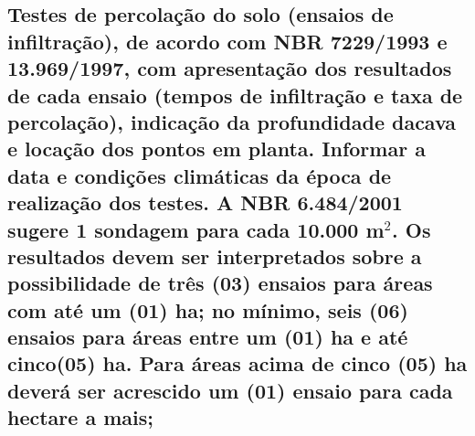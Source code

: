 \subsection{Testes de percolação do solo (ensaios de infiltração), de acordo com NBR 7229/1993 e 13.969/1997, com apresentação dos resultados de cada ensaio (tempos de infiltração e taxa de percolação), indicação da profundidade dacava e locação dos pontos em planta. Informar a data e condições climáticas da época de realização dos testes. A NBR 6.484/2001 sugere 1 sondagem para cada 10.000 m$^2$. Os resultados devem ser interpretados sobre a possibilidade de três (03) ensaios para áreas com até um (01) ha; no mínimo, seis (06) ensaios para áreas entre um (01) ha e até cinco(05) ha. Para áreas acima de cinco (05) ha deverá ser acrescido um (01) ensaio para cada hectare a mais;}
